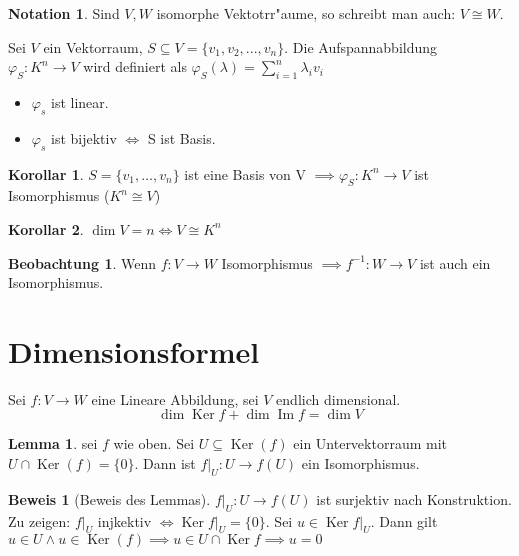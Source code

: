 \documentclass[oneside,fontsize=11pt,paper=a4,BCOR=0mm,DIV=12,automark,headsepline]{scrbook}
\DeclareMathOperator{\mdim}{dim}
\DeclareMathOperator{\mKer}{Ker}
\DeclareMathOperator{\mIm}{Im}
\theoremstyle{remark}
\theoremstyle{definition}
\newtheorem{beobachtung}{Beobachtung}
\newtheorem*{notation}{Notation}
\newtheorem{lemma}{Lemma}[section]
\newtheorem*{korollar}{Korollar}
\theoremstyle{definition}
\newtheorem*{prof}{Beweis}
\theoremstyle{remark}
\begin{document}
\begin{notation}
Sind $V, W$ isomorphe Vektotrr"aume, so schreibt man auch: $V \cong W$.
\end{notation}

\begin{exa}
  Sei \(V\) ein Vektorraum, \(S\subseteq V = \{v_1, v_2, ..., v_n\}\). Die
  Aufspannabbildung $\varphi_S: K^n \rightarrow V$ wird definiert als $\varphi_S(\lambda)=\sum_{i=1}^{n}\lambda_i v_i$

  \begin{itemize}
  \item \(\varphi_s\) ist linear.
  \item \(\varphi_s\) ist bijektiv \(\iff\) S ist Basis.
  \end{itemize}
\end{exa}

\begin{korollar}
  \(S=\{v_1,\ldots,v_n\}\) ist eine Basis von V $\implies \varphi_S: K^n \rightarrow V$ ist Isomorphismus ($K^n\cong V$)
\end{korollar}

\begin{korollar}
  \(\dim V = n \iff V\cong K^n\)
\end{korollar}

\begin{beobachtung}
  Wenn \(f:V\rightarrow W\) Isomorphismus $\implies f^{-1}:W\rightarrow V $ ist auch ein Isomorphismus.
\end{beobachtung}

\section{Dimensionsformel}
\label{sec:org9a58004}
\begin{theo}{}{}
  Sei \(f:V\to W\) eine Lineare Abbildung, sei \(V\) endlich dimensional. \[\mdim\mKer f + \mdim\mIm f = \mdim V\]
\end{theo}

\begin{lemma} sei \(f\) wie oben. Sei \(U \subseteq \mKer(f)\) ein Untervektorraum mit \(U \cap \mKer(f) = \{0\}\).  Dann ist \(f|_U:U\to f(U)\) ein Isomorphismus.
\end{lemma}

\begin{prof}[Beweis des Lemmas]
  \(f|_U:U\to f(U)\) ist surjektiv nach Konstruktion. \\ Zu zeigen: \(f|_U\) injkektiv \(\iff \mKer f|_U = \{0\}\). Sei \(u\in \mKer f|_U \). Dann gilt \(u\in U \land u \in \mKer(f) \implies u \in U \cap \mKer f \implies u = 0\)
\end{prof}
\end{document}
